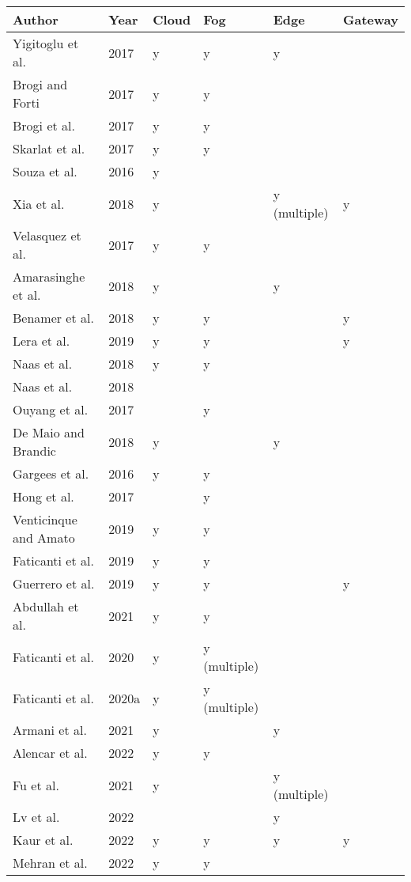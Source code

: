 
\begin{tabular}[t]{l|l|l|l|l|l}
\hline
Author & Year & Cloud & Fog & Edge & Gateway\\
\hline
Yigitoglu et al. & 2017 & y & y & y & \\
\hline
Brogi and Forti & 2017 & y & y &  & \\
\hline
Brogi et al. & 2017 & y & y &  & \\
\hline
Skarlat et al. & 2017 & y & y &  & \\
\hline
Souza et al. & 2016 & y &  &  & \\
\hline
Xia et al. & 2018 & y &  & y (multiple) & y\\
\hline
Velasquez et al. & 2017 & y & y &  & \\
\hline
Amarasinghe et al. & 2018 & y &  & y & \\
\hline
Benamer et al. & 2018 & y & y &  & y\\
\hline
Lera et al. & 2019 & y & y &  & y\\
\hline
Naas et al. & 2018 & y & y &  & \\
\hline
Naas et al. & 2018 &  &  &  & \\
\hline
Ouyang et al. & 2017 &  & y &  & \\
\hline
De Maio and Brandic & 2018 & y &  & y & \\
\hline
Gargees et al. & 2016 & y & y &  & \\
\hline
Hong et al. & 2017 &  & y &  & \\
\hline
Venticinque and Amato & 2019 & y & y &  & \\
\hline
Faticanti et al. & 2019 & y & y &  & \\
\hline
Guerrero et al. & 2019 & y & y &  & y\\
\hline
Abdullah et al. & 2021 & y & y &  & \\
\hline
Faticanti et al. & 2020 & y & y (multiple) &  & \\
\hline
Faticanti et al. & 2020a & y & y (multiple) &  & \\
\hline
Armani et al. & 2021 & y &  & y & \\
\hline
Alencar et al. & 2022 & y & y &  & \\
\hline
Fu et al. & 2021 & y &  & y (multiple) & \\
\hline
Lv et al. & 2022 &  &  & y & \\
\hline
Kaur et al. & 2022 & y & y & y & y\\
\hline
Mehran et al. & 2022 & y & y &  & \\
\hline
\end{tabular}
